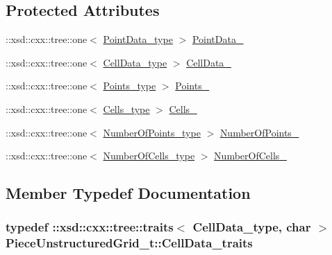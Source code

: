 \subsection*{Protected Attributes}
\begin{DoxyCompactItemize}
\item 
\+::xsd\+::cxx\+::tree\+::one$<$ \hyperlink{classPieceUnstructuredGrid__t_a5d79d8ea03ca53f80f24e62c2175ec02}{Point\+Data\+\_\+type} $>$ \hyperlink{classPieceUnstructuredGrid__t_a0c0f8305eeb054bb13a2ddcb702a40b9}{Point\+Data\+\_\+}
\item 
\+::xsd\+::cxx\+::tree\+::one$<$ \hyperlink{classPieceUnstructuredGrid__t_a4232a7b88477ee6f692a4e5fab6a65d1}{Cell\+Data\+\_\+type} $>$ \hyperlink{classPieceUnstructuredGrid__t_a4bc29dafe4e199e9584daa18f334fc27}{Cell\+Data\+\_\+}
\item 
\+::xsd\+::cxx\+::tree\+::one$<$ \hyperlink{classPieceUnstructuredGrid__t_a7747b159a3d1eee8d02a0eefaa235711}{Points\+\_\+type} $>$ \hyperlink{classPieceUnstructuredGrid__t_a661b6b8c1f38305c84b2864f496c37d8}{Points\+\_\+}
\item 
\+::xsd\+::cxx\+::tree\+::one$<$ \hyperlink{classPieceUnstructuredGrid__t_aca1ec38eff08bde0cd115c54dbb7a20f}{Cells\+\_\+type} $>$ \hyperlink{classPieceUnstructuredGrid__t_a8f3ced6893abfdf02faa2627d8f8c00c}{Cells\+\_\+}
\item 
\+::xsd\+::cxx\+::tree\+::one$<$ \hyperlink{classPieceUnstructuredGrid__t_a8df1cd0d138d990e166d325ceed9a660}{Number\+Of\+Points\+\_\+type} $>$ \hyperlink{classPieceUnstructuredGrid__t_ac16a2c2521aa4fd072a36b845cba38ef}{Number\+Of\+Points\+\_\+}
\item 
\+::xsd\+::cxx\+::tree\+::one$<$ \hyperlink{classPieceUnstructuredGrid__t_aeae5546900c50a4abe9b3aea485e97d0}{Number\+Of\+Cells\+\_\+type} $>$ \hyperlink{classPieceUnstructuredGrid__t_a3d55c06e74e3753fccc74f80a0886c32}{Number\+Of\+Cells\+\_\+}
\end{DoxyCompactItemize}


\subsection{Member Typedef Documentation}
\subsubsection[{\texorpdfstring{Cell\+Data\+\_\+traits}{CellData_traits}}]{\setlength{\rightskip}{0pt plus 5cm}typedef \+::xsd\+::cxx\+::tree\+::traits$<$ {\bf Cell\+Data\+\_\+type}, char $>$ {\bf Piece\+Unstructured\+Grid\+\_\+t\+::\+Cell\+Data\+\_\+traits}}\hypertarget{classPieceUnstructuredGrid__t_a0e04d369c16993da7e5e2a7152c2e518}{}\label{classPieceUnstructuredGrid__t_a0e04d369c16993da7e5e2a7152c2e518}
